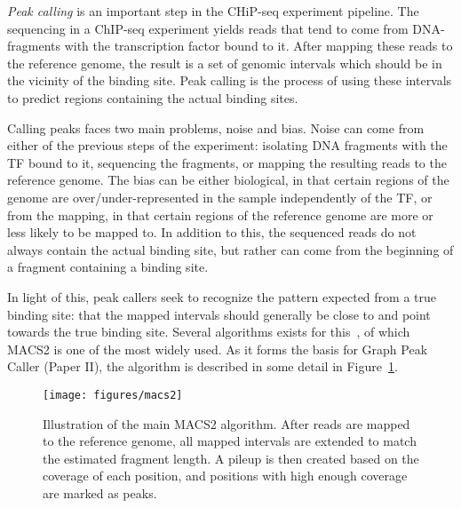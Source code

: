 \emph{Peak calling} is an important step in the CHiP-seq experiment pipeline.
The sequencing in a ChIP-seq experiment yields reads that tend to come from DNA-fragments with the transcription factor bound to it.
After mapping these reads to the reference genome, the result is a set of genomic intervals which should be in the vicinity of the binding site.
Peak calling is the process of using these intervals to predict regions containing the actual binding sites. 

Calling peaks faces two main problems, noise and bias.
Noise can come from either of the previous steps of the experiment: isolating DNA fragments with the TF bound to it, sequencing the fragments, or mapping the resulting reads to the reference genome.
The bias can be either biological, in that certain regions of the genome are over/under-represented in the sample independently of the TF, or from the mapping, in that certain regions of the reference genome are more or less likely to be mapped to.
In addition to this, the sequenced reads do not always contain the actual binding site, but rather can come from the beginning of a fragment containing a binding site. 

In light of this, peak callers seek to recognize the pattern expected from a true binding site: that the mapped intervals should generally be close to and point towards the true binding site.
Several algorithms exists for this~\cite{SPP, macs}, of which MACS2 is one of the most widely used.
As it forms the basis for Graph Peak Caller (Paper II), the algorithm is described in some detail in Figure~\ref{fig:macs}.

\begin{figure}
  \texttt{[image: figures/macs2]}
  \caption{
    Illustration of the main MACS2 algorithm.
    After reads are mapped to the reference genome, all mapped intervals are extended to match the estimated fragment length.
    A pileup is then created based on the coverage of each position, and positions with high enough coverage are marked as peaks.}
  \label{fig:macs}
\end{figure}

% 
% 
% 
% 
% 
% 
% 
% 
% 
% 
% 
% 
% 
% 
% 
% 
% 
% 
% 
% 
% 
% 
% 
% 
% 
% 
% 
% 
% 
% 
% 
% 
% 
% 
% 
% 
% 
% 
% 
% 
% 
% 
% 
% 
% 
% 
% 
% 
% 
% 
% 
% 
% 
% 
% 
% 
% 
% 
% 
% 
% 
% 
% 
% 
% 
% 
% 
% 
% 
% 
% 
% 
% 
% 
% 
% 
% 
% 
% 
% 
% 
% 
% 
% 
% 
% 
% 
% 
% 
% 
% 
% 
% 
% 
% 
% 
% 
% 
% 
% 
% 
% 
% 
% 
% 
% 
% 
% 
% 
% 
